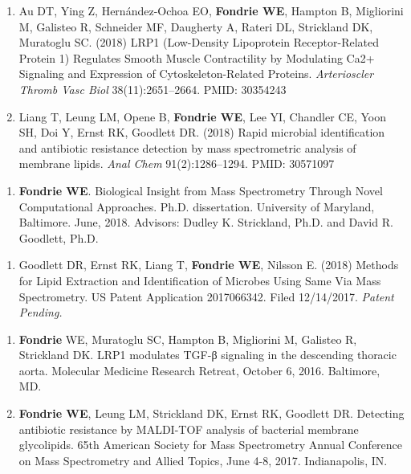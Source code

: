 \documentclass{article}
\newcommand{\mysection}[1]{\vspace{1ex}{\bf #1}}
\begin{document}
\begin{enumerate}
  \item Au DT, Ying Z, Hernández-Ochoa EO, \textbf{Fondrie WE}, Hampton B, Migliorini M, Galisteo R, Schneider MF, Daugherty A, Rateri DL, Strickland DK, Muratoglu SC. (2018) LRP1 (Low-Density Lipoprotein Receptor-Related Protein 1) Regulates Smooth Muscle Contractility by Modulating Ca2+ Signaling and Expression of Cytoskeleton-Related Proteins. \textit{Arterioscler Thromb Vasc Biol} 38(11):2651--2664. PMID: 30354243

  \item Liang T, Leung LM, Opene B, \textbf{Fondrie WE}, Lee YI, Chandler CE, Yoon SH, Doi Y, Ernst RK, Goodlett DR. (2018) Rapid microbial identification and antibiotic resistance detection by mass spectrometric analysis of membrane lipids. \textit{Anal Chem} 91(2):1286--1294. PMID: 30571097 
\end{enumerate}

\mysection{Additional Publications}
\begin{enumerate}
  \item {\bf Fondrie WE}. Biological Insight from Mass Spectrometry Through Novel Computational Approaches. Ph.D. dissertation. University of Maryland, Baltimore. June, 2018. Advisors: Dudley K. Strickland, Ph.D. and David R. Goodlett, Ph.D.
\end{enumerate}

\mysection{Patents}
\begin{enumerate}
  \item Goodlett DR, Ernst RK, Liang T, {\bf Fondrie WE}, Nilsson E. (2018) Methods for Lipid Extraction and Identification of Microbes Using Same Via Mass Spectrometry. US Patent Application 2017066342. Filed 12/14/2017. {\it Patent Pending.}
\end{enumerate}

\mysection{Oral Presentations}
\begin{enumerate}
  \item {\bf Fondrie} WE, Muratoglu SC, Hampton B, Migliorini M, Galisteo R, Strickland DK. LRP1 modulates TGF-β signaling in the descending thoracic aorta. Molecular Medicine Research Retreat, October 6, 2016. Baltimore, MD.

  \item {\bf Fondrie WE}, Leung LM, Strickland DK, Ernst RK, Goodlett DR. Detecting antibiotic resistance by MALDI-TOF analysis of bacterial membrane glycolipids. 65th American Society for Mass Spectrometry Annual Conference on Mass Spectrometry and Allied Topics, June 4-8, 2017. Indianapolis, IN.
\end{enumerate}
\end{document}
